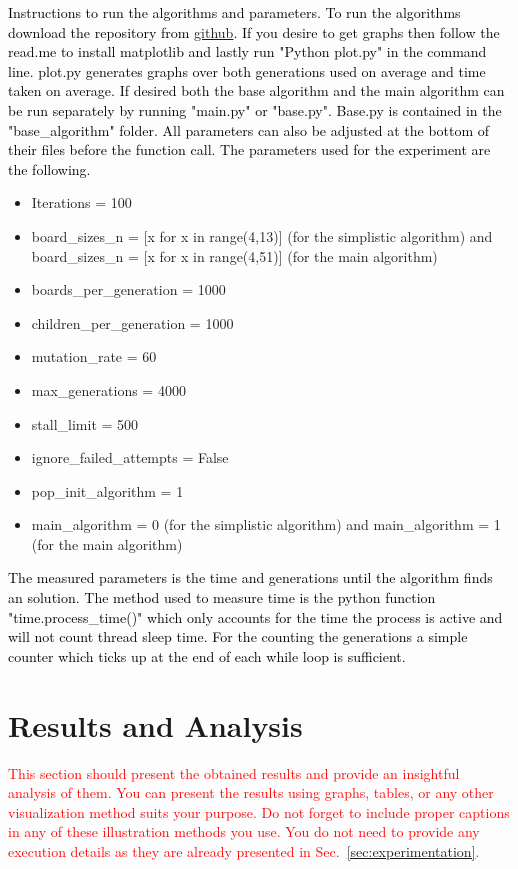 \documentclass{scrartcl}
\begin{document}
\textcolor{black}{Instructions to run the algorithms and parameters. To run the algorithms download the repository from \href{https://github.com/Sneakycloud/N-queens\_problem\_Evolutionary\_Alg/tree/main}{github}. If you desire to get graphs then follow the read.me to install matplotlib and lastly run "Python plot.py" in the command line. plot.py generates graphs over both generations used on average and time taken on average. If desired both the base algorithm and the main algorithm can be run separately by running "main.py" or "base.py". Base.py is contained in the "base\_algorithm" folder. All parameters can also be adjusted at the bottom of their files before the function call. The parameters used for the experiment are the following.}
\begin{itemize}
	\item Iterations = 100
	\item board\_sizes\_n = [x for x in range(4,13)] (for the simplistic algorithm) and board\_sizes\_n = [x for x in range(4,51)] (for the main algorithm)
	\item boards\_per\_generation = 1000
	\item children\_per\_generation = 1000
	\item mutation\_rate = 60
	\item max\_generations = 4000
	\item stall\_limit = 500
	\item ignore\_failed\_attempts = False
	\item pop\_init\_algorithm = 1
	\item main\_algorithm = 0 (for the simplistic algorithm) and main\_algorithm = 1 (for the main algorithm)
\end{itemize}

\textcolor{black}{The measured parameters is the time and generations until the algorithm finds an solution. The method used to measure time is the python function "time.process\_time()" which only accounts for the time the process is active and will not count thread sleep time. For the counting the generations a simple counter which ticks up at the end of each while loop is sufficient.}

\section{Results and Analysis}
\label{sec:results-analysis}

\textcolor{red}{This section should present the obtained results and provide an insightful analysis of them. You can present the results using graphs, tables, or any other visualization method suits your purpose. Do not forget to include proper captions \cite{zobel2014graphs} in any of these illustration methods you use. You do not need to provide any execution details as they are already presented in Sec.~\ref{sec:experimentation}.}
\end{document}
